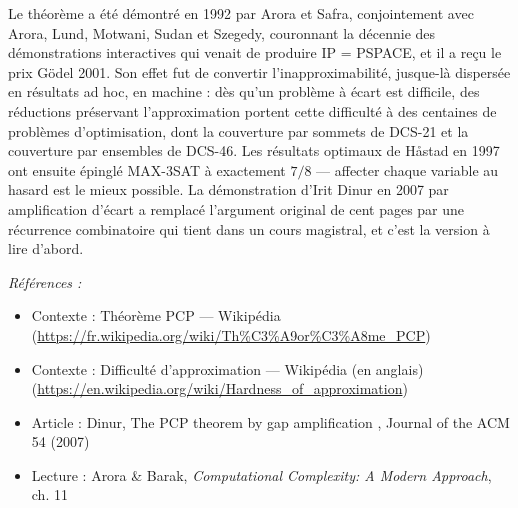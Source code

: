 \documentclass[11pt]{article}
\newenvironment{refs}{\par\small\noindent\emph{Références :}\begin{itemize}\setlength\itemsep{0pt}}{\end{itemize}\normalsize}
\begin{document}
\noindent Le théorème a été démontré en 1992 par Arora et Safra, conjointement avec Arora, Lund, Motwani, Sudan et Szegedy, couronnant la décennie des démonstrations interactives qui venait de produire IP = PSPACE, et il a reçu le prix Gödel 2001. Son effet fut de convertir l'inapproximabilité, jusque-là dispersée en résultats ad hoc, en machine : dès qu'un problème à écart est difficile, des réductions préservant l'approximation portent cette difficulté à des centaines de problèmes d'optimisation, dont la couverture par sommets de DCS-21 et la couverture par ensembles de DCS-46. Les résultats optimaux de Håstad en 1997 ont ensuite épinglé MAX-3SAT à exactement $ 7/8 $ --- affecter chaque variable au hasard est le mieux possible. La démonstration d'Irit Dinur en 2007 par amplification d'écart a remplacé l'argument original de cent pages par une récurrence combinatoire qui tient dans un cours magistral, et c'est la version à lire d'abord.

\begin{refs}
\item Contexte : Théorème PCP --- Wikipédia (\url{https://fr.wikipedia.org/wiki/Th%C3%A9or%C3%A8me_PCP})
\item Contexte : Difficulté d'approximation --- Wikipédia (en anglais) (\url{https://en.wikipedia.org/wiki/Hardness_of_approximation})
\item Article : Dinur, \og{} The PCP theorem by gap amplification \fg{}, Journal of the ACM 54 (2007)
\item Lecture : Arora \& Barak, \textit{Computational Complexity: A Modern Approach}, ch. 11
\end{refs}

\bigskip
\end{document}

